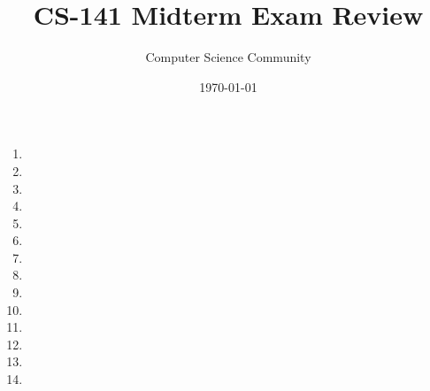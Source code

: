 \documentclass[11pt]{article}
\title{CS-141 Midterm Exam Review}
\author{Computer Science Community}
\date{\today}
\begin{document}
\header

\begin{enumerate}
    \item 

    \item 

 	\item 

\pagebreak
    \item 

\vfill
\pagebreak

    \item 

    \item 
    
\pagebreak
	\item 


\newpage
	\item 

	\item 

\newpage
	\item 
\vspace{1.5in}

\newpage
	\item 

\newpage
	\item 

\newpage

	\item 

	\item 

\end{enumerate}
\end{document}
